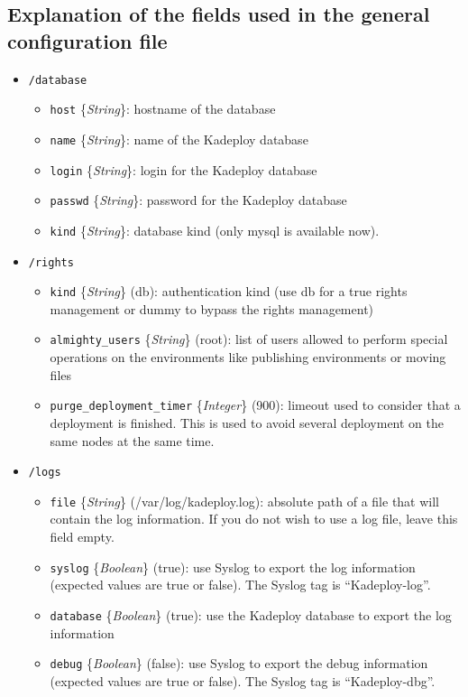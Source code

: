 \documentclass[a4wide,10pt,oneside]{book}
\newcommand{\ypath}[1]{\texttt{#1}}
\newcommand{\yfield}[2]{\texttt{#1} {\small\{{\emph{#2}}\}}:}
\newcommand{\yfieldd}[3]{\texttt{#1} {\small\{{\emph{#2}}\}} {\small(}#3{\small)}:}
\begin{document}
\subsection{Explanation of the fields used in the general configuration file}
\begin{itemize}
  \item \ypath{/database}
  \begin{itemize}
    \item \yfield{host}{String} hostname of the database
    \item \yfield{name}{String} name of the Kadeploy database
    \item \yfield{login}{String} login for the Kadeploy database
    \item \yfield{passwd}{String} password for the Kadeploy database
    \item \yfield{kind}{String} database kind (only mysql is available now).
  \end{itemize}

  \item \ypath{/rights}
  \begin{itemize}
    \item \yfieldd{kind}{String}{db} authentication kind (use db for a true rights management or dummy to bypass the rights management)
    \item \yfieldd{almighty\_users}{String}{root} list of users allowed to perform special operations on the environments like publishing environments or moving files
    \item \yfieldd{purge\_deployment\_timer}{Integer}{900} limeout used to consider that a deployment is finished. This is used to avoid several deployment on the same nodes at the same time.
  \end{itemize}

  \item \ypath{/logs}
  \begin{itemize}
    \item \yfieldd{file}{String}{/var/log/kadeploy.log} absolute path of a file that will contain the log information. If you do not wish to use a log file, leave this field empty.
    \item \yfieldd{syslog}{Boolean}{true} use Syslog to export the log information (expected values are true or false). The Syslog tag is ``Kadeploy-log''.
    \item \yfieldd{database}{Boolean}{true} use the Kadeploy database to export the log information
    \item \yfieldd{debug}{Boolean}{false} use Syslog to export the debug information (expected values are true or false). The Syslog tag is ``Kadeploy-dbg''.
  \end{itemize}


\end{itemize}
\end{document}
